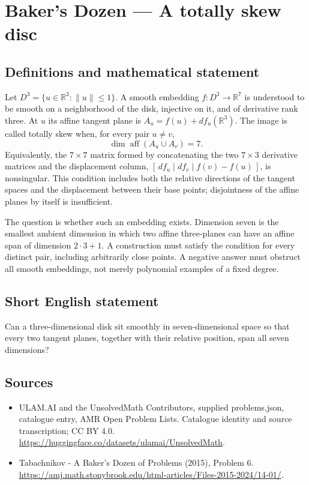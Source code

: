 \documentclass[11pt,a4paper]{article}
\begin{document}
\section*{Baker's Dozen — A totally skew disc}\label{statement}

\subsection{Definitions and mathematical statement}
Let $D^3=\{u\in\mathbb R^3:\|u\|\le1\}$. A smooth embedding
$f:D^3\to\mathbb R^7$ is understood to be smooth on a neighborhood of the
disk, injective on it, and of derivative rank three. At $u$ its affine tangent
plane is
$A_u=f(u)+df_u(\mathbb R^3)$.
The image is called totally skew when, for every pair $u\ne v$,
\[
 \dim\operatorname{aff}(A_u\cup A_v)=7.
\]
Equivalently, the $7\times7$ matrix formed by concatenating the two
$7\times3$ derivative matrices and the displacement column,
$[\,df_u\mid df_v\mid f(v)-f(u)\,]$, is nonsingular. This condition includes both the relative
directions of the tangent spaces and the displacement between their base
points; disjointness of the affine planes by itself is insufficient.

The question is whether such an embedding exists. Dimension seven is the
smallest ambient dimension in which two affine three-planes can have an
affine span of dimension $2\cdot3+1$. A construction must satisfy the
condition for every distinct pair, including arbitrarily close points.
A negative answer must obstruct all smooth embeddings, not merely
polynomial examples of a fixed degree.
\subsection{Short English statement}
Can a three-dimensional disk sit smoothly in seven-dimensional space so
that every two tangent planes, together with their relative position, span
all seven dimensions?
\subsection{Sources}
\begin{itemize}
\item[S1] ULAM.AI and the UnsolvedMath Contributors, supplied problems.json, catalogue entry, AMR Open Problem Lists. Catalogue identity and source transcription; CC BY 4.0.
\url{https://huggingface.co/datasets/ulamai/UnsolvedMath}.
\item[S2] Tabachnikov - A Baker's Dozen of Problems (2015), Problem 6. 
\url{https://amj.math.stonybrook.edu/html-articles/Files-2015-2024/14-01/}.
\end{itemize}
\end{document}
